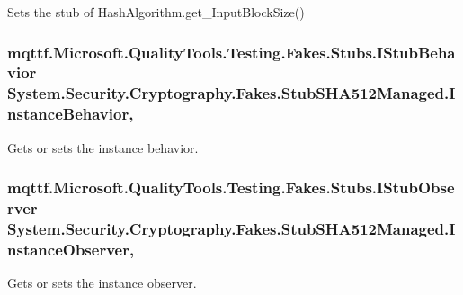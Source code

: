 Sets the stub of Hash\-Algorithm.\-get\-\_\-\-Input\-Block\-Size()

\hypertarget{class_system_1_1_security_1_1_cryptography_1_1_fakes_1_1_stub_s_h_a512_managed_a16a11a71967830254b1bd1fce70a4b32}{
\subsubsection[{Instance\-Behavior}]{\setlength{\rightskip}{0pt plus 5cm}mqttf.\-Microsoft.\-Quality\-Tools.\-Testing.\-Fakes.\-Stubs.\-I\-Stub\-Behavior System.\-Security.\-Cryptography.\-Fakes.\-Stub\-S\-H\-A512\-Managed.\-Instance\-Behavior\hspace{0.3cm}{\ttfamily [get]}, {\ttfamily [set]}}}\label{class_system_1_1_security_1_1_cryptography_1_1_fakes_1_1_stub_s_h_a512_managed_a16a11a71967830254b1bd1fce70a4b32}


Gets or sets the instance behavior.

\hypertarget{class_system_1_1_security_1_1_cryptography_1_1_fakes_1_1_stub_s_h_a512_managed_ab2eb3324a9ae6749394c1e04af4f7126}{
\subsubsection[{Instance\-Observer}]{\setlength{\rightskip}{0pt plus 5cm}mqttf.\-Microsoft.\-Quality\-Tools.\-Testing.\-Fakes.\-Stubs.\-I\-Stub\-Observer System.\-Security.\-Cryptography.\-Fakes.\-Stub\-S\-H\-A512\-Managed.\-Instance\-Observer\hspace{0.3cm}{\ttfamily [get]}, {\ttfamily [set]}}}\label{class_system_1_1_security_1_1_cryptography_1_1_fakes_1_1_stub_s_h_a512_managed_ab2eb3324a9ae6749394c1e04af4f7126}


Gets or sets the instance observer.

